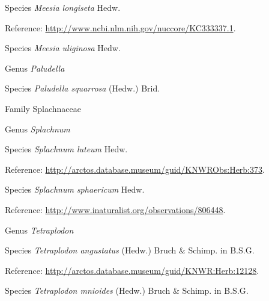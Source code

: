\documentclass[9pt, article]{memoir}
\begin{document}
\begin{multicols}{2}
\vspace{6pt}\noindent\hspace{36pt}Species \textit{Meesia longiseta} Hedw.


\vspace{6pt}Reference: 
\url{http://www.ncbi.nlm.nih.gov/nuccore/KC333337.1}.

\vspace{6pt}\noindent\hspace{36pt}Species \textit{Meesia uliginosa} Hedw.


\vspace{6pt}\noindent\hspace{30pt}Genus \textit{Paludella}


\vspace{6pt}\noindent\hspace{36pt}Species \textit{Paludella squarrosa} (Hedw.) Brid.


\vspace{6pt}\noindent\hspace{24pt}Family Splachnaceae


\vspace{6pt}\noindent\hspace{30pt}Genus \textit{Splachnum}


\vspace{6pt}\noindent\hspace{36pt}Species \textit{Splachnum luteum} Hedw.


\vspace{6pt}Reference: 
\url{http://arctos.database.museum/guid/KNWRObs:Herb:373}.

\vspace{6pt}\noindent\hspace{36pt}Species \textit{Splachnum sphaericum} Hedw.


\vspace{6pt}Reference: 
\url{http://www.inaturalist.org/observations/806448}.

\vspace{6pt}\noindent\hspace{30pt}Genus \textit{Tetraplodon}


\vspace{6pt}\noindent\hspace{36pt}Species \textit{Tetraplodon angustatus} (Hedw.) Bruch \& Schimp. in B.S.G.


\vspace{6pt}Reference: 
\url{http://arctos.database.museum/guid/KNWR:Herb:12128}.

\vspace{6pt}\noindent\hspace{36pt}Species \textit{Tetraplodon mnioides} (Hedw.) Bruch \& Schimp. in B.S.G.



\end{multicols}
\end{document}
